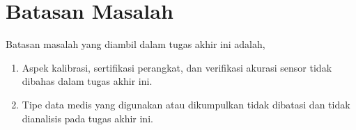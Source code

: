 \section{Batasan Masalah}\label{batasan-masalah}

Batasan masalah yang diambil dalam tugas akhir ini adalah,

\begin{enumerate}  
  \item Aspek kalibrasi, sertifikasi perangkat, dan verifikasi akurasi sensor tidak dibahas dalam tugas akhir ini.
  
  \item Tipe data medis yang digunakan atau dikumpulkan tidak dibatasi dan tidak dianalisis pada tugas akhir ini. 
\end{enumerate}
